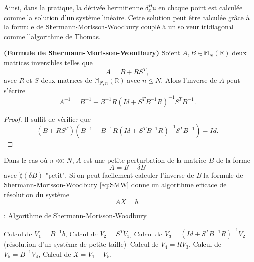 Ainsi, dans la pratique, la dérivée hermitienne $\delta_x^H \mathfrak{u}$ en chaque point est calculée comme la solution d'un système linéaire. Cette solution peut être calculée grâce à la formule de Shermann-Morisson-Woodbury couplé à un solveur tridiagonal comme l'algorithme de Thomas.

\begin{proposition}
\textbf{(Formule de Shermann-Morisson-Woodbury)} Soient $A, B \in \mathbb{M}_N \left(\mathbb{R} \right)$ deux matrices inversibles telles que 
\begin{equation}
A = B + R S^T,
\end{equation}
avec $R$ et $S$ deux matrices de $\mathbb{M}_{N,n} \left(\mathbb{R} \right)$ avec $n \leq N$.
Alors l'inverse de $A$ peut s'écrire
\begin{equation}
A^{-1} = B^{-1} - B^{-1} R \left( Id + S^T B^{-1} R  \right)^{-1} S^T B^{-1}.
\label{eq:SMW}
\end{equation}
\end{proposition}

\begin{proof}
Il suffit de vérifier que 
\begin{equation}
\left( B + R S^T \right) \left( B^{-1} - B^{-1} R \left( Id + S^T B^{-1} R  \right)^{-1} S^T B^{-1} \right) = Id.
\end{equation}
\end{proof}

Dans le cas où $n \lll N$, $A$ est une petite perturbation de la matrice $B$ de la forme 
\begin{equation}
A = B + \delta B
\end{equation}
avec $\rang  (\delta B) $ "petit". Si on peut facilement calculer l'inverse de $B$ la formule de Shermann-Morisson-Woodbury \eqref{eq:SMW} donne un algorithme efficace de résolution du système
\begin{equation}
A X = b.
\end{equation} 

\begin{center}
\begin{minipage}[H]{12cm}
  \begin{algorithm}[H]
    \caption{: Algorithme de Shermann-Morisson-Woodbury}\label{alg:SMW}
    \begin{algorithmic}[1]
	\State Calcul de $V_1 = B^{-1} b$,
	\State Calcul de $V_2 = S^T V_1$,
	\State Calcul de $V_3 = (Id + S^T B^{-1}R)^{-1} V_2$ (résolution d'un système de petite taille),
	\State Calcul de $V_4 = R V_3$,
	\State Calcul de $V_5 = B^{-1} V_4$,
	\State Calcul de $X = V_1 - V_5$.
    \end{algorithmic}
    \end{algorithm}
\end{minipage}
\end{center}

